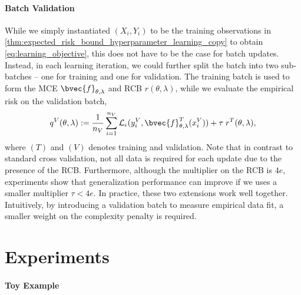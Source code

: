 \documentclass[twoside]{article}
\begin{document}
		\paragraph{Batch Validation} While we simply instantiated $(X_{i}, Y_{i})$ to be the training observations in \cref{thm:expected_risk_bound_hyperparameter_learning_copy} to obtain \eqref{eq:learning_objective}, this does not have to be the case for batch updates. Instead, in each learning iteration, we could further split the batch into two sub-batches -- one for training and one for validation. The training batch is used to form the \gls{MCE} $\bvec{f}_{\theta, \lambda}$ and \gls{RCB} $r(\theta, \lambda)$, while we evaluate the empirical risk on the validation batch,
		\begin{equation}
		q^{V}(\theta, \lambda) := \frac{1}{n_{V}} \sum_{i = 1}^{n_{V}} \mathcal{L}_{\epsilon}(y^{V}_{i}, \bvec{f}^{T}_{\theta, \lambda}(x^{V}_{i})) + \tau \; r^{T}(\theta, \lambda),
		\label{eq:validation_learning_objective}
		\end{equation}
		where $(T)$ and $(V)$ denotes training and validation. Note that in contrast to standard cross validation, not all data is required for each update due to the presence of the \gls{RCB}. Furthermore, although the multiplier on the \gls{RCB} is $4 e$, experiments show that generalization performance can improve if we uses a smaller multiplier $\tau < 4 e$. In practice, these two extensions work well together. Intuitively, by introducing a validation batch to measure empirical data fit, a smaller weight on the complexity penalty is required. 

	\section{Experiments}
	\label{sec:experiments}
	
	\paragraph{Toy Example}
		
\end{document}
